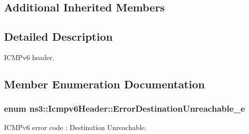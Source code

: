 \subsection*{Additional Inherited Members}


\subsection{Detailed Description}
I\+C\+M\+Pv6 header. 

\subsection{Member Enumeration Documentation}
\subsubsection[{\texorpdfstring{Error\+Destination\+Unreachable\+\_\+e}{ErrorDestinationUnreachable_e}}]{\setlength{\rightskip}{0pt plus 5cm}enum {\bf ns3\+::\+Icmpv6\+Header\+::\+Error\+Destination\+Unreachable\+\_\+e}}\hypertarget{classns3_1_1Icmpv6Header_a2609b9581c3de3d6bbf8d55f5adf0d1d}{}\label{classns3_1_1Icmpv6Header_a2609b9581c3de3d6bbf8d55f5adf0d1d}


I\+C\+M\+Pv6 error code \+: Destination Unreachable. 

